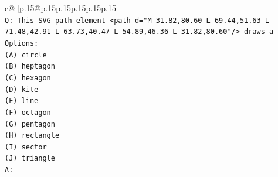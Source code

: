 \documentclass{article}
\begin{document}
{\begin{supertabular}{c@{$\;$}|p{.15\linewidth}@{}p{.15\linewidth}p{.15\linewidth}p{.15\linewidth}p{.15\linewidth}p{.15\linewidth}}
{{{\\ 
\texttt{Q: This SVG path element <path d="M 31.82,80.60 L 69.44,51.63 L 71.48,42.91 L 63.73,40.47 L 54.89,46.36 L 31.82,80.60"/> draws a} \\
\texttt{Options:} \\
\texttt{(A) circle} \\
\texttt{(B) heptagon} \\
\texttt{(C) hexagon} \\
\texttt{(D) kite} \\
\texttt{(E) line} \\
\texttt{(F) octagon} \\
\texttt{(G) pentagon} \\
\texttt{(H) rectangle} \\
\texttt{(I) sector} \\
\texttt{(J) triangle} \\
\texttt{A:} \\
            }
        }
    }
     \\ \\


\end{supertabular}}
\end{document}
